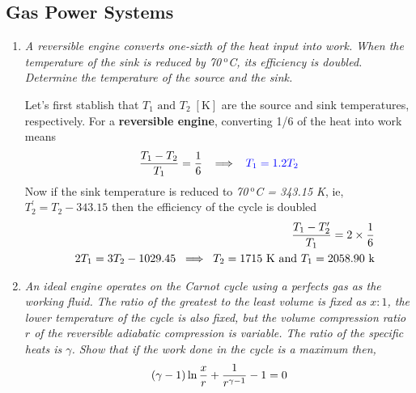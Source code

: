 \pagebreak

\subsection{Gas Power Systems}

\begin{enumerate}

\item {\it A reversible engine converts one-sixth of the heat input into work. When the temperature of the sink is reduced by 70$^{\text{ o}}$C, its efficiency is doubled. Determine the temperature of the source and the sink.}

Let's first stablish that $T_{1}\text{ and }T_{2}\;\left[\text{K}\right]$ are the source and sink temperatures, respectively. For a {\bf reversible engine}, converting 1/6 of the heat into work means
\begin{displaymath}
\displaystyle\frac{T_{1}-T_{2}}{T_{1}}=\displaystyle\frac{1}{6} \;\;\; \Longrightarrow \;\;\; \textcolor{blue}{T_{1}=1.2T_{2}}
\end{displaymath}
Now if the sink temperature is reduced to {\it 70$^{\text{ o}}$C = 343.15 K}, ie, $T_{2}^{\prime}=T_{2}-343.15$ then the efficiency of the cycle is doubled
\begin{eqnarray}
&& \displaystyle\frac{T_{1}-T_{2}^{\prime}}{T_{1}}=2\times\displaystyle\frac{1}{6} \nonumber \\
&& 2T_{1}=3T_{2}-1029.45\;\;\Longrightarrow\;\;T_{2}=1715\text{ K and }T_{1}=2058.90\text{ k}\nonumber
\end{eqnarray}

\item {\it An ideal engine operates on the Carnot cycle using a perfects gas as the working fluid. The ratio of the greatest to the least volume is fixed as $x : 1$, the lower temperature of the cycle is also fixed, but the volume compression ratio $r$ of the reversible adiabatic compression is variable. The ratio of the specific heats is $\gamma$. Show that if the work done in the cycle is a maximum then,
\begin{displaymath}
  \left(\gamma-1\right)\ln\displaystyle\frac{x}{r}+\displaystyle\frac{1}{r^{\gamma-1}}-1=0
\end{displaymath}
}


\end{enumerate}
